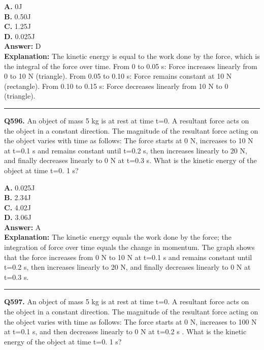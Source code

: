 \documentclass[12pt]{article}
\begin{document}
\textbf{A.} 0J \\
\textbf{B.} 0.50J \\
\textbf{C.} 1.25J \\
\textbf{D.} 0.025J \\

\textbf{Answer:} D \\
\textbf{Explanation:} The kinetic energy is equal to the work done by the force, which is the integral of the force over time.
From 0 to 0.05 s: Force increases linearly from 0 to 10 N (triangle).
From 0.05 to 0.10 s: Force remains constant at 10 N (rectangle).
From 0.10 to 0.15 s: Force decreases linearly from 10 N to 0 (triangle).

\hrule
\vspace{1em}


\noindent
\textbf{Q596.} An object of mass
5
kg is at rest at time t=0. A resultant force acts on the object in a constant direction. The magnitude of the resultant force acting on the object varies with time as follows:
\cdot 
The force starts at 0 N, increases to 10 N at t=0.1 s and remains constant until t=0.2 s, then increases linearly to 20 N, and finally decreases linearly to 0 N at t=0.3 s.
What is the kinetic energy of the object at time t=0.
1
s?



\textbf{A.} 0.025J \\
\textbf{B.} 2.34J \\
\textbf{C.} 4.02J \\
\textbf{D.} 3.06J \\

\textbf{Answer:} A \\
\textbf{Explanation:} The kinetic energy equals the work done by the force; the integration of force over time equals the change in momentum. The graph shows that the force increases from 0 N to 10 N at t=0.1 s and remains constant until t=0.2 s, then increases linearly to 20 N, and finally decreases linearly to 0 N at t=0.3 s.

\hrule
\vspace{1em}


\noindent
\textbf{Q597.} An object of mass 5 kg is at rest at time t=0. A resultant force acts on the object in a constant direction. The magnitude of the resultant force acting on the object varies with time as follows:
\cdot 
The force starts at 0 N, increases to 100 N at t=0.1 s, and then decreases linearly to 0 N at t=0.2 s .
What is the kinetic energy of the object at time t=0.
1
s?
\end{document}

